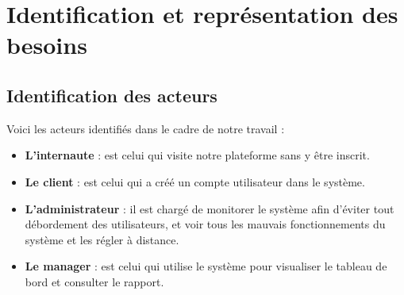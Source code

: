 \section[Identification et représentation des besoins]{Identification et représentation des besoins}    
    \subsection[Identification des acteurs]{Identification des acteurs}
    Voici les acteurs identifiés dans le cadre de notre
    travail :
    \par
        \begin{itemize}
            \setlength{\itemsep}{0pt}
            \item [\ding{226}] \textbf{L’internaute} : est celui qui visite
            notre plateforme sans y être inscrit.
            \item [\ding{226}] \textbf{Le client} : est celui qui a créé un compte
            utilisateur dans le système.
            \item [\ding{226}] \textbf{L’administrateur} : il est chargé de
            monitorer le système afin d’éviter tout débordement des utilisateurs,
            et voir tous les mauvais fonctionnements du système et les régler
            à distance.
            \item [\ding{226}] \textbf{Le manager} : est celui qui utilise le système
            pour visualiser le tableau de bord et consulter le rapport.
        \end{itemize}
